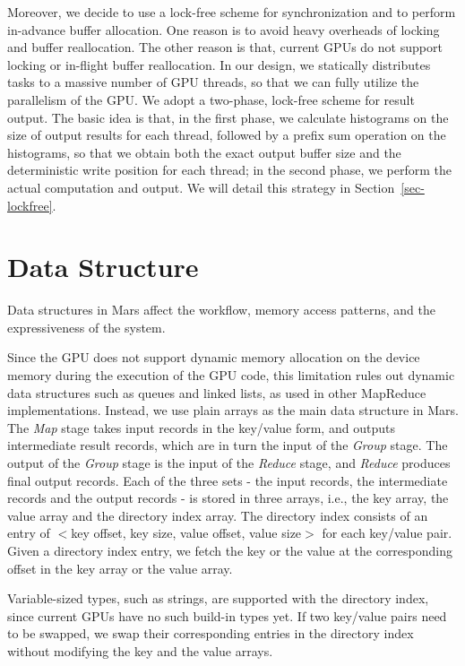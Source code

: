 Moreover, we decide to use a lock-free scheme for synchronization
and to perform in-advance buffer allocation. One reason is to
avoid heavy overheads of locking and buffer reallocation. The
other reason is that, current GPUs do not support locking
or in-flight buffer reallocation. In our design, we statically
distributes tasks to a massive number of GPU threads, so that we
can fully utilize the parallelism of the GPU. We adopt a two-phase,
lock-free scheme for result output. The basic idea is that, in the
first phase, we calculate histograms on the size of output results for each
thread, followed by a prefix sum operation on the histograms,
so that we obtain both the exact output buffer size and the deterministic
write position for each thread; in the second phase, we
perform the actual computation and output. We will detail this strategy in
Section~\ref{sec-lockfree}.

\section{Data Structure} \label{sec-datastructure}
Data structures in Mars affect the workflow, memory access patterns, and the expressiveness of the system.

Since the GPU does not support dynamic memory allocation on the
device memory during the execution of the GPU code, this limitation rules out
 dynamic data structures such as queues and linked lists, as used in
other MapReduce implementations. Instead, we use plain arrays as the
main data structure in Mars. The {\em Map} stage takes input records in
the key/value form, and outputs intermediate result records, which
are in turn the input of the {\em Group} stage. The output of the {\em Group}
stage is the input of the {\em Reduce} stage, and {\em Reduce} produces final output
records. Each of the three sets - the input records, the intermediate records and the
output records  - is stored in three arrays, i.e., the
key array, the value array and the directory index array. The
directory index consists of an entry of $<$key offset, key size,
value offset, value size$>$ for each key/value pair. Given a
directory index entry, we fetch the key or the value at the
corresponding offset in the key array or the value array.

Variable-sized types, such as strings, are supported with the directory index, since current GPUs have no such build-in types yet. If
two key/value pairs need to be swapped, we swap their corresponding
entries in the directory index without modifying the key and the
value arrays.

